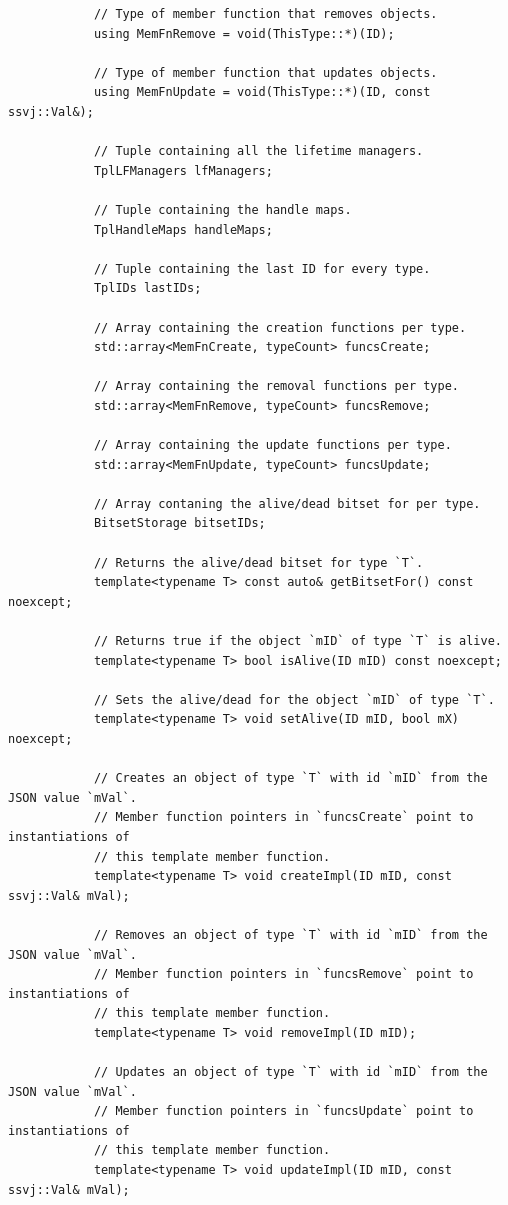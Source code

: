 \documentclass{report}
\begin{document}
\begin{verbatim}
            // Type of member function that removes objects.
            using MemFnRemove = void(ThisType::*)(ID);

            // Type of member function that updates objects.
            using MemFnUpdate = void(ThisType::*)(ID, const ssvj::Val&);

            // Tuple containing all the lifetime managers.
            TplLFManagers lfManagers;

            // Tuple containing the handle maps.
            TplHandleMaps handleMaps;

            // Tuple containing the last ID for every type.
            TplIDs lastIDs;

            // Array containing the creation functions per type.
            std::array<MemFnCreate, typeCount> funcsCreate;

            // Array containing the removal functions per type.
            std::array<MemFnRemove, typeCount> funcsRemove;

            // Array containing the update functions per type.
            std::array<MemFnUpdate, typeCount> funcsUpdate;

            // Array contaning the alive/dead bitset for per type.
            BitsetStorage bitsetIDs;

            // Returns the alive/dead bitset for type `T`.
            template<typename T> const auto& getBitsetFor() const noexcept;

            // Returns true if the object `mID` of type `T` is alive.
            template<typename T> bool isAlive(ID mID) const noexcept;

            // Sets the alive/dead for the object `mID` of type `T`.
            template<typename T> void setAlive(ID mID, bool mX) noexcept;

            // Creates an object of type `T` with id `mID` from the JSON value `mVal`.
            // Member function pointers in `funcsCreate` point to instantiations of
            // this template member function.
            template<typename T> void createImpl(ID mID, const ssvj::Val& mVal);

            // Removes an object of type `T` with id `mID` from the JSON value `mVal`.
            // Member function pointers in `funcsRemove` point to instantiations of
            // this template member function.
            template<typename T> void removeImpl(ID mID);
            
            // Updates an object of type `T` with id `mID` from the JSON value `mVal`.
            // Member function pointers in `funcsUpdate` point to instantiations of
            // this template member function.
            template<typename T> void updateImpl(ID mID, const ssvj::Val& mVal);


\end{verbatim}
\end{document}
